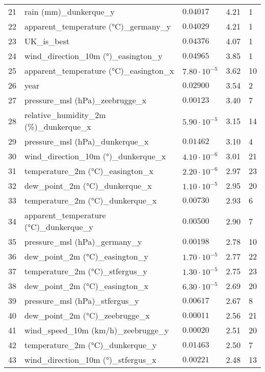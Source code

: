 \begin{table}[H]
\begin{tabular}{r l l l l}
        21 & rain (mm)\_dunkerque\_y & $0.04017$ & 4.21 & 1 \\
        22 & apparent\_temperature (°C)\_germany\_y & $0.04029$ & 4.21 & 1 \\
        23 & UK\_is\_best & $0.04376$ & 4.07 & 1 \\
        24 & wind\_direction\_10m (°)\_easington\_y & $0.04965$ & 3.85 & 1 \\
        25 & apparent\_temperature (°C)\_easington\_x & $7.80 \cdot 10^{-5}$ & 3.62 & 10 \\
        26 & year & $0.02900$ & 3.54 & 2 \\
        27 & pressure\_msl (hPa)\_zeebrugge\_x & $0.00123$ & 3.40 & 7 \\
        28 & relative\_humidity\_2m (\%)\_dunkerque\_x & $5.90 \cdot 10^{-5}$ & 3.15 & 14 \\
        29 & pressure\_msl (hPa)\_dunkerque\_x & $0.01462$ & 3.10 & 4 \\
        30 & wind\_direction\_10m (°)\_dunkerque\_x & $4.10 \cdot 10^{-6}$ & 3.01 & 21 \\
        31 & temperature\_2m (°C)\_easington\_x & $2.20 \cdot 10^{-6}$ & 2.97 & 23 \\
        32 & dew\_point\_2m (°C)\_dunkerque\_x & $1.10 \cdot 10^{-5}$ & 2.95 & 20 \\
        33 & temperature\_2m (°C)\_dunkerque\_x & $0.00730$ & 2.93 & 6 \\
        34 & apparent\_temperature (°C)\_dunkerque\_y & $0.00500$ & 2.90 & 7 \\
        35 & pressure\_msl (hPa)\_germany\_y & $0.00198$ & 2.78 & 10 \\
        36 & dew\_point\_2m (°C)\_easington\_y & $1.70 \cdot 10^{-5}$ & 2.77 & 22 \\
        37 & temperature\_2m (°C)\_stfergus\_y & $1.30 \cdot 10^{-5}$ & 2.75 & 23 \\
        38 & dew\_point\_2m (°C)\_easington\_x & $6.30 \cdot 10^{-5}$ & 2.69 & 20 \\
        39 & pressure\_msl (hPa)\_stfergus\_y & $0.00617$ & 2.67 & 8 \\
        40 & dew\_point\_2m (°C)\_zeebrugge\_x & $0.00011$ & 2.56 & 21 \\
        41 & wind\_speed\_10m (km/h)\_zeebrugge\_y & $0.00020$ & 2.51 & 20 \\
        42 & temperature\_2m (°C)\_dunkerque\_y & $0.01463$ & 2.50 & 7 \\
        43 & wind\_direction\_10m (°)\_stfergus\_x & $0.00221$ & 2.48 & 13 \\

\end{tabular}
\end{table}
